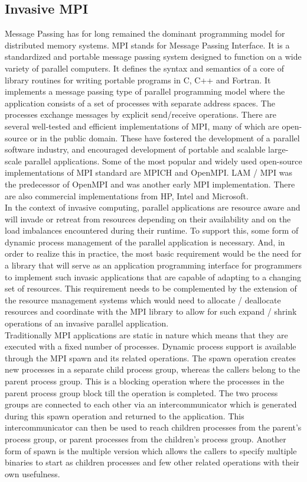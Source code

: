 \subsection{Invasive MPI}
Message Passing has for long remained the dominant programming model for distributed memory systems. MPI stands for Message Passing Interface. It is a standardized and portable message passing system designed to function on a wide variety of parallel computers. It defines the syntax and semantics of a core of library routines for writing portable programs in C, C++ and Fortran. It implements a message passing type of parallel programming model where the application consists of a set of processes with separate address spaces. The processes exchange messages by explicit send/receive operations. There are several well-tested and efficient implementations of MPI, many of which are open-source or in the public domain. These have fostered the development of a parallel software industry, and encouraged development of portable and scalable large-scale parallel applications. Some of the most popular and widely used open-source implementations of MPI standard are MPICH and OpenMPI. LAM / MPI was the predecessor of OpenMPI and was another early MPI implementation. There are also commercial implementations from HP, Intel and Microsoft.\\ 

In the context of invasive computing, parallel applications are resource aware and will invade or retreat from resources depending on their availability and on the load imbalances encountered during their runtime. To support this, some form of dynamic process management of the parallel application is necessary. And, in order to realize this in practice, the most basic requirement would be the need for a library that will serve as an application programming interface for programmers to implement such invasic applications that are capable of adapting to a changing set of resources. This requirement needs to be complemented by the extension of the resource management systems which would need to allocate / deallocate resources and coordinate with the MPI library to allow for such expand / shrink operations of an invasive parallel application. \\

Traditionally MPI applications are static in nature which means that they are executed with a fixed number of processes. Dynamic process support is available through the MPI spawn and its related operations. The spawn operation creates new processes in a separate child process group, whereas the callers belong to the parent process group. This is a blocking operation where the processes in the parent process group block till the operation is completed. The two process groups are connected to each other via an intercommunicator which is generated during this spawn operation and returned to the application. This intercommunicator can then be used to reach children processes from the parent's process group, or parent processes from the children's process group. Another form of spawn is the multiple version which allows the callers to specify multiple binaries to start as children processes and few other related operations with their own usefulness. \\

